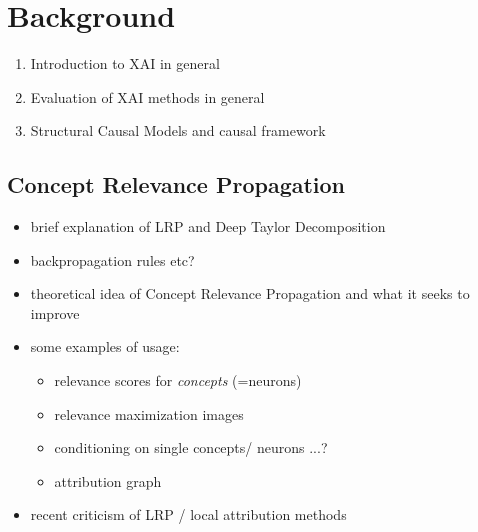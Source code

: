 \chapter{Background}\label{chapter:background}

{ \color{red} 
\begin{enumerate}
    \item Introduction to XAI in general
    \item Evaluation of XAI methods in general
    \item Structural Causal Models and causal framework
\end{enumerate}
 }


\section{Concept Relevance Propagation}
\begin{itemize}
    \item brief explanation of LRP and Deep Taylor Decomposition
    \item backpropagation rules etc? 
    \item theoretical idea of Concept Relevance Propagation and what it seeks to improve
    \item some examples of usage:
    \begin{itemize}
        \item relevance scores for \textit{concepts} (=neurons)
        \item relevance maximization images
        \item conditioning on single concepts/ neurons ...? 
        \item attribution graph 
    \end{itemize}
    \item recent criticism of LRP / local attribution methods
\end{itemize}

 
